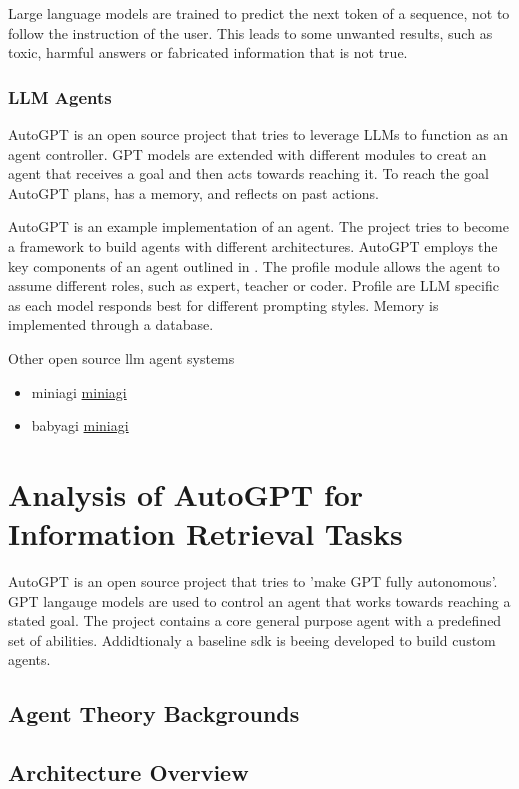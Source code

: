\documentclass[english, version-2022-01]{uzl-thesis}
\begin{document}
Large language models are trained to predict the next token of a sequence, not to follow the instruction of the user. This leads to some unwanted results, such as toxic, harmful answers or fabricated information that is not true.

\subsection{LLM Agents}

AutoGPT is an open source project that tries to leverage LLMs to function as an agent controller. GPT models are extended with different modules to creat an agent that receives a goal and then acts towards reaching it. To reach the goal AutoGPT plans, has a memory, and reflects on past actions.

AutoGPT is an example implementation of an agent. The project tries to become a framework to build agents with different architectures.
AutoGPT employs the key components of an agent outlined in \cite{Wang2023}. The profile module allows the agent to assume different roles, such as expert, teacher or coder. Profile are LLM specific as each model responds best for different prompting styles. Memory is implemented through a database.

Other open source llm agent systems
\begin{itemize}
	\item miniagi \href{}{miniagi}
	\item babyagi \href{https://github.com/yoheinakajima/babyagi}{miniagi}
\end{itemize}

\chapter{Analysis of AutoGPT for Information Retrieval Tasks}


AutoGPT is an open source project that tries to 'make GPT fully autonomous'. GPT langauge models are used to control an agent that works towards reaching a stated goal. The project contains a core general purpose agent with a predefined set of abilities. Addidtionaly a baseline sdk is beeing developed to build custom agents.
\section{Agent Theory Backgrounds}

\section{Architecture Overview}
\end{document}
